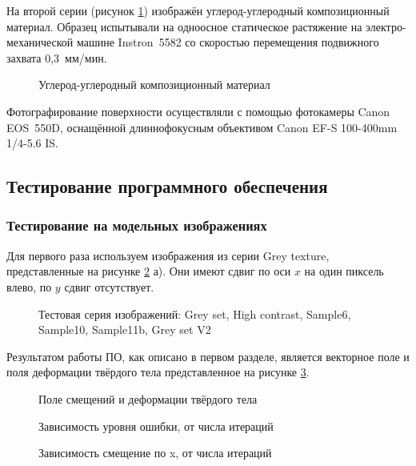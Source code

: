 На второй серии (рисунок \ref{pic:carbon_deform}) изображён углерод-углеродный композиционный материал. Образец испытывали на одноосное статическое растяжение на электро-механической машине Instron 5582 со скоростью перемещения подвижного захвата 0,3 мм/мин.
\begin{figure}[ht]
\caption{Углерод-углеродный композиционный материал}
\label{pic:carbon_deform}
\end{figure}

Фотографирование поверхности осуществляли с помощью фотокамеры Canon EOS 550D, оснащённой длиннофокусным объективом Canon EF-S 100-400mm 1/4-5.6 IS.

\subsection{Тестирование программного обеспечения}
\subsubsection{Тестирование на модельных изображениях}

Для первого раза используем изображения из серии Grey texture, представленные на рисунке \ref{pic:gray_mix} а). Они имеют сдвиг по оси $x$ на один пиксель влево, по $y$ сдвиг отсутствует.

\begin{figure}[ht]
\caption{Тестовая серия изображений: Grey set, High contrast, Sample6, Sample10, Sample11b, Grey set V2 }
\label{pic:gray_mix}
\end{figure}

Результатом работы ПО, как описано в первом разделе, является векторное поле и поля деформации твёрдого тела представленное на рисунке \ref{pic:gray_set_out}.

\begin{figure}[ht]
\caption{Поле смещений и деформации твёрдого тела}
\label{pic:gray_set_out}
\end{figure}

\begin{figure}[ht]
\caption{Зависимость уровня ошибки, от числа итераций}
\label{pic:gray_set_func_iteration}
\end{figure}

\begin{figure}[ht]
\caption{Зависимость смещение по x, от числа итераций}
\label{pic:gray_set_func_iter_vector}
\end{figure}

